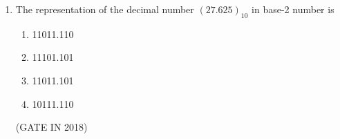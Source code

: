 
\usepackage{enumitem}

\begin{enumerate}
\item
\label{prob:gate IN 18}
The representation of the decimal number $(27.625)_{10}$ in base-2 number is
\begin{enumerate}[label=(\Alph*)]
    \item 11011.110
    \item 11101.101
    \item 11011.101
    \item 10111.110
\end{enumerate}
\hfill(GATE IN 2018)

\end{enumerate}
